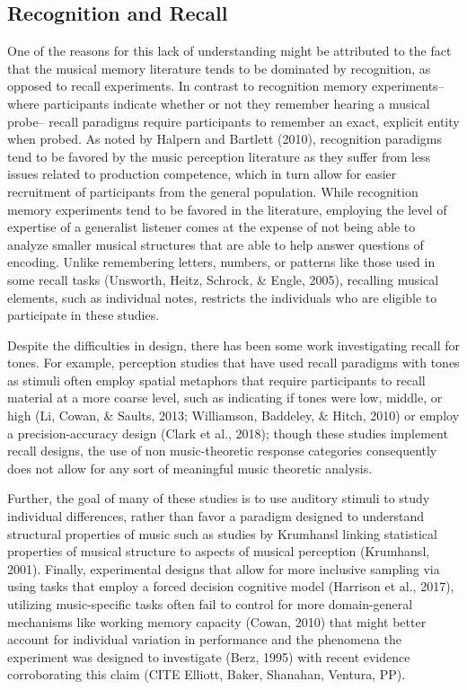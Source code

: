 \documentclass[english,man]{apa6}
\begin{document}
\hypertarget{recognition-and-recall}{%
\subsection{Recognition and Recall}\label{recognition-and-recall}}

One of the reasons for this lack of understanding might be attributed to the fact that the musical memory literature tends to be dominated by recognition, as opposed to recall experiments.
In contrast to recognition memory experiments-- where participants indicate whether or not they remember hearing a musical probe-- recall paradigms require participants to remember an exact, explicit entity when probed.
As noted by Halpern and Bartlett (2010), recognition paradigms tend to be favored by the music perception literature as they suffer from less issues related to production competence, which in turn allow for easier recruitment of participants from the general population.
While recognition memory experiments tend to be favored in the literature, employing the level of expertise of a generalist listener comes at the expense of not being able to analyze smaller musical structures that are able to help answer questions of encoding.
Unlike remembering letters, numbers, or patterns like those used in some recall tasks (Unsworth, Heitz, Schrock, \& Engle, 2005), recalling musical elements, such as individual notes, restricts the individuals who are eligible to participate in these studies.

Despite the difficulties in design, there has been some work investigating recall for tones.
For example, perception studies that have used recall paradigms with tones as stimuli often employ spatial metaphors that require participants to recall material at a more coarse level, such as indicating if tones were low, middle, or high (Li, Cowan, \& Saults, 2013; Williamson, Baddeley, \& Hitch, 2010) or employ a precision-accuracy design (Clark et al., 2018); though these studies implement recall designs, the use of non music-theoretic response categories consequently does not allow for any sort of meaningful music theoretic analysis.

Further, the goal of many of these studies is to use auditory stimuli to study individual differences, rather than favor a paradigm designed to understand structural properties of music such as studies by Krumhansl linking statistical properties of musical structure to aspects of musical perception (Krumhansl, 2001).
Finally, experimental designs that allow for more inclusive sampling via using tasks that employ a forced decision cognitive model (Harrison et al., 2017), utilizing music-specific tasks often fail to control for more domain-general mechanisms like working memory capacity (Cowan, 2010) that might better account for individual variation in performance and the phenomena the experiment was designed to investigate (Berz, 1995) with recent evidence corroborating this claim (CITE Elliott, Baker, Shanahan, Ventura, PP).
\end{document}

